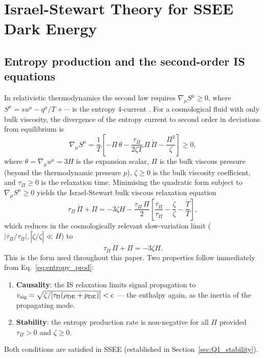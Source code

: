 \documentclass[12pt,a4paper]{article}
\newcommand{\tauPi}{\tau_\Pi}
\begin{document}
\section{Israel-Stewart Theory for SSEE Dark Energy}
\label{sec:theory}

\subsection{Entropy production and the second-order IS equations}
\label{subsec:entropy}

In relativistic thermodynamics the second law requires
$\nabla_\mu S^\mu \geq 0$, where $S^\mu = su^\mu - q^\mu/T + \cdots$
is the entropy 4-current \citep{Weinberg1971,Israel1976,IsraelStewart1979}.
For a cosmological fluid with only bulk viscosity, the divergence of the entropy
current to second order in deviations from equilibrium is
\begin{equation}
  \nabla_\mu S^\mu = \frac{1}{T}\!\left[-\Pi\,\theta
    - \frac{\tauPi}{2\zeta T}\,\Pi\,\dot{\Pi}
    - \frac{\Pi^2}{\zeta}\right] \geq 0,
  \label{eq:entropy_prod}
\end{equation}
where $\theta = \nabla_\mu u^\mu = 3H$ is the expansion scalar,
$\Pi$ is the bulk viscous pressure (beyond the thermodynamic pressure $p$),
$\zeta \geq 0$ is the bulk viscosity coefficient, and
$\tauPi \geq 0$ is the relaxation time.
Minimising the quadratic form subject to $\nabla_\mu S^\mu \geq 0$ yields the
Israel-Stewart bulk viscous relaxation equation
\begin{equation}
  \tauPi\,\dot{\Pi} + \Pi = -3\zeta H
    - \frac{\tauPi\,\Pi}{2}\left[\frac{\dot{\tauPi}}{\tauPi}
    - \frac{\dot{\zeta}}{\zeta} - \frac{\dot{T}}{T}\right],
  \label{eq:IS_full}
\end{equation}
which reduces in the cosmologically relevant slow-variation limit
($|\dot{\tauPi}/\tauPi|, |\dot{\zeta}/\zeta| \ll H$) to
\begin{equation}
  \boxed{\tauPi\,\dot{\Pi} + \Pi = -3\zeta H.}
  \label{eq:IS_simple}
\end{equation}
This is the form used throughout this paper.
Two properties follow immediately from Eq.~\eqref{eq:entropy_prod}:
\begin{enumerate}
  \item \textbf{Causality}: the IS relaxation limits signal propagation to
    $v_{\rm sig} = \sqrt{\zeta/[\tauPi(\rho_{\mathrm{DE}}+p_{\mathrm{DE}})]} < c$
    \citep{HiscockLindblom1983} --- the enthalpy again, as the inertia of the
    propagating mode.
  \item \textbf{Stability}: the entropy production rate is non-negative for all
    $\Pi$ provided $\tauPi > 0$ and $\zeta \geq 0$.
\end{enumerate}
Both conditions are satisfied in SSEE (established in Section~\ref{sec:Q1_stability}).
\end{document}
